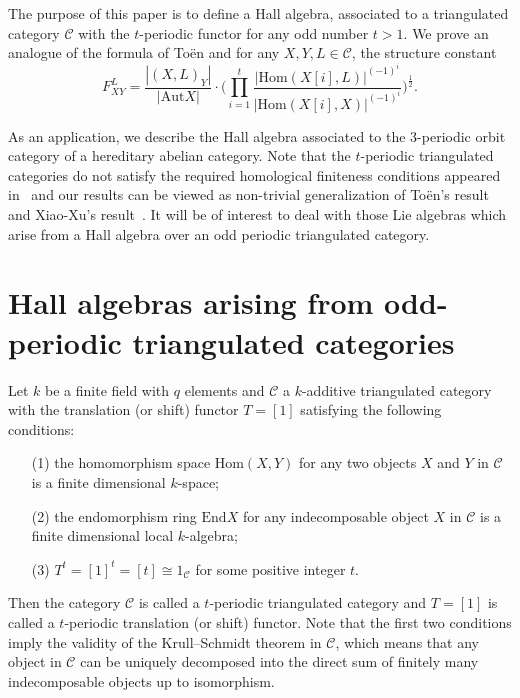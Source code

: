 \documentclass{amsart}
\theoremstyle{definition}
\numberwithin{equation}{section}
\begin{document}
The purpose of this paper is to define a Hall algebra, associated to
a triangulated category $\mathcal{C}$ with the $t$-periodic functor
for any odd number $t>1$. We prove an analogue of the formula of
To\"{e}n \cite[Proposition 5.1]{Toen2005} and for any $X,Y,L\in
\mathcal{C}$, the structure constant
$$F_{XY}^L=\displaystyle\frac{|(X,L)_{Y}|}{|\mathrm{Aut}X|}\cdot
\big(\prod_{i=1}^t\displaystyle\frac{|{\mathrm{Hom}}(X[i],
L)|^{(-1)^i}}{|{\mathrm{Hom}}(X[i], X)|^{(-1)^i}}\big)^{\frac{1}{2}}.$$

As an application, we describe the Hall algebra associated to the
$3$-periodic orbit category of a hereditary abelian category. Note
that the $t$-periodic triangulated categories do not satisfy the
required homological finiteness conditions appeared
in~\cite{Toen2005,XX2006} and our results can be viewed as
non-trivial generalization of To\"{e}n's result \cite{Toen2005} and
Xiao-Xu's result~\cite{XX2006}. It will be of interest to deal with
those Lie algebras which arise from a Hall algebra over an odd
periodic triangulated category.

\section{Hall algebras arising from odd-periodic triangulated categories}
Let $k$ be a finite field with $q$ elements and ${{\mathcal{C}}}$ a $k$-additive
triangulated category with the translation (or shift) functor
$T=[1]$ satisfying the following conditions:
\begin{enumerate}
\item[(1)] the homomorphism space ${\mathrm{Hom}}(X,Y)$ for any two
objects $X$ and $Y$ in ${{\mathcal{C}}}$ is a finite dimensional $k$-space;
\item[(2)] the endomorphism ring ${\mbox{End}} X$ for any indecomposable
object $X$ in ${{\mathcal{C}}}$ is a finite dimensional local $k$-algebra;
\item[(3)] $T^t=[1]^t=[t] \cong 1_{{\mathcal{C}}}$ for some positive integer $t$.
\end{enumerate}
Then the category ${{\mathcal{C}}}$ is called a $t$-periodic triangulated
category and $T=[1]$ is called a $t$-periodic translation (or shift)
functor. Note that the first two conditions imply the validity of
the Krull--Schmidt theorem in ${{\mathcal{C}}}$, which means that any object in
${{\mathcal{C}}}$ can be uniquely decomposed into the direct sum of finitely
many indecomposable objects up to isomorphism.
\end{document}
